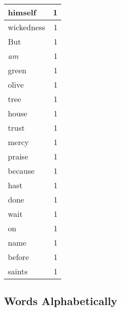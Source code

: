 \begin{center}
\begin{longtable}{l|r}
himself & 1 \\ \hline
wickedness & 1 \\ \hline
But & 1 \\ \hline
\emph{am} & 1 \\ \hline
green & 1 \\ \hline
olive & 1 \\ \hline
tree & 1 \\ \hline
house & 1 \\ \hline
trust & 1 \\ \hline
mercy & 1 \\ \hline
praise & 1 \\ \hline
because & 1 \\ \hline
hast & 1 \\ \hline
done & 1 \\ \hline
wait & 1 \\ \hline
on & 1 \\ \hline
name & 1 \\ \hline
before & 1 \\ \hline
saints & 1 \\ \hline
\end{longtable}
\end{center}



\normalsize



\subsection{Words Alphabetically}

